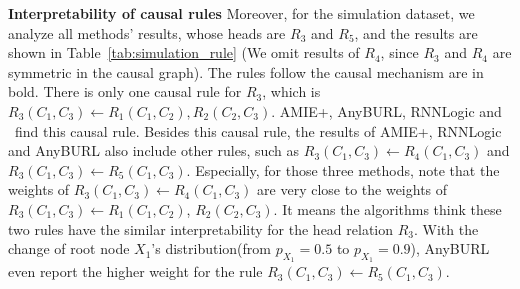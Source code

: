 \noindent
\textbf{Interpretability of causal rules}
Moreover, for the simulation dataset, we analyze all methods' results, whose heads are $R_3$ and $R_5$, and the results are shown in Table~\ref{tab:simulation_rule} (We omit results of $R_4$, since $R_3$ and $R_4$ are symmetric in the causal graph).
The rules follow the causal mechanism are in bold.
There is only one causal rule for $R_3$, which is $R_3(C_1,C_3) \gets R_1(C_1,C_2), R_2(C_2,C_3)$.
AMIE+, AnyBURL, RNNLogic and \dname~find this causal rule.
Besides this causal rule, the results of AMIE+, RNNLogic and AnyBURL also include other rules, such as $R_3(C_1,C_3) \gets R_4(C_1,C_3)$ and $R_3(C_1,C_3) \gets R_5(C_1,C_3)$.
Especially, for those three methods, note that the weights of $R_3(C_1,C_3) \gets R_4(C_1,C_3)$ are very close to the weights of $R_3(C_1,C_3) \gets R_1(C_1,C_2)$, $ R_2(C_2,C_3)$.
It means the algorithms think these two rules have the similar interpretability for the head relation $R_3$.
With the change of root node $X_1$'s distribution(from $p_{X_1}=0.5$ to $p_{X_1}=0.9$), AnyBURL even report the higher weight for the rule $R_3(C_1,C_3) \gets R_5(C_1,C_3)$.
